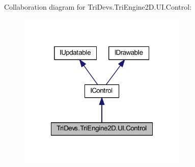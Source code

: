 Collaboration diagram for Tri\-Devs.\-Tri\-Engine2\-D.\-U\-I.\-Control\-:
\nopagebreak
\begin{figure}[H]
\begin{center}
\leavevmode
\includegraphics[width=228pt]{class_tri_devs_1_1_tri_engine2_d_1_1_u_i_1_1_control__coll__graph}
\end{center}
\end{figure}
